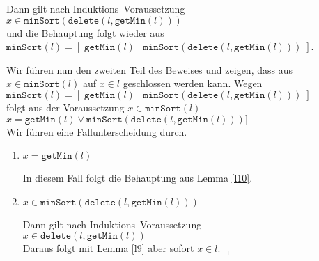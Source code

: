 \documentclass{article}
\begin{document}
\begin{enumerate}
\begin{enumerate}
             Dann gilt nach Induktions--Voraussetzung \\[0.1cm]
             \hspace*{1.3cm} $x \in \mathtt{minSort}(\mathtt{delete}(l,\mathtt{getMin}(l)))$ \\[0.1cm]
             und die Behauptung folgt wieder aus $\mathtt{minSort}(l) = [\;\mathtt{getMin}(l)\;|\;\mathtt{minSort}(\mathtt{delete}(l,\mathtt{getMin}(l)))\;]$. 
       \end{enumerate}
       Wir f\"uhren nun den zweiten Teil des Beweises und zeigen, dass aus $x \in \mathtt{minSort}(l)$
       auf $x\in l$ geschlossen werden kann.  Wegen \\[0.1cm]
       \hspace*{1.3cm}  $\mathtt{minSort}(l) = [\;\mathtt{getMin}(l)\;|\;\mathtt{minSort}(\mathtt{delete}(l,\mathtt{getMin}(l)))\;]$  \\[0.1cm]
       folgt aus der Voraussetzung $x \in \mathtt{minSort} (l)$ \\[0.1cm]
       \hspace*{1.3cm} $x = \mathtt{getMin}(l) \vee \mathtt{minSort}(\mathtt{delete}(l,\mathtt{getMin}(l)))]$ \\[0.1cm]
       Wir f\"uhren eine Fallunterscheidung durch.
       \begin{enumerate}
       \item $x = \mathtt{getMin}(l)$

             In diesem Fall folgt die Behauptung aus Lemma \ref{l10}.
       \item $x \in \mathtt{minSort}(\mathtt{delete}(l,\mathtt{getMin}(l)))$

             Dann gilt nach Induktions--Voraussetzung \\[0.1cm]
             \hspace*{1.3cm} $x \in \mathtt{delete}(l,\mathtt{getMin}(l))$ \\[0.1cm]
             Daraus folgt mit Lemma \ref{l9} aber sofort $x \in l$. \hspace*{\fill} $_\Box$
       \end{enumerate}
\end{enumerate}
\end{document}
